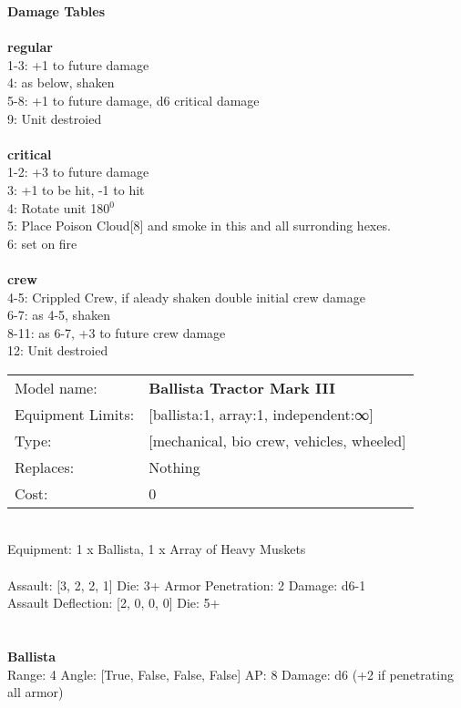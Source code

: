 {\bf Damage Tables} \\
\ \\ {\bf regular } \\
1-3: +1 to future damage \\
4: as below, shaken \\
5-8: +1 to future damage, d6 critical damage \\
9: Unit destroied \\
\ \\ {\bf critical } \\
1-2: +3 to future damage \\
3: +1 to be hit, -1 to hit \\
4: Rotate unit 180$^0$ \\
5: Place Poison Cloud[8] and smoke in this and all surronding hexes. \\
6: set on fire \\
\ \\ {\bf crew } \\
4-5: Crippled Crew, if aleady shaken double initial crew damage \\
6-7: as 4-5, shaken \\
8-11: as 6-7, +3 to future crew damage \\
12: Unit destroied \\


\noindent
\begin{tabular}{ll}
Model name: &{\bf Ballista Tractor Mark III } \\
Equipment Limits: &[ballista:1, array:1, independent:∞] \\
Type: &[mechanical, bio crew, vehicles, wheeled] \\
Replaces: &Nothing \\
Cost: & 0\\
\end{tabular}
\ \\
Equipment: 1 x Ballista, 1 x Array of Heavy Muskets \\
\ \\
Assault: [3, 2, 2, 1] Die: 3+ Armor Penetration: 2 Damage: d6-1 \\
Assault Deflection: [2, 0, 0, 0] Die: 5+\\
\indent  
\ \\

\ \\
{\bf Ballista } \\



Range: 4  Angle: [True, False, False, False] AP: 8 Damage: d6 (+2 if penetrating all armor) \\




